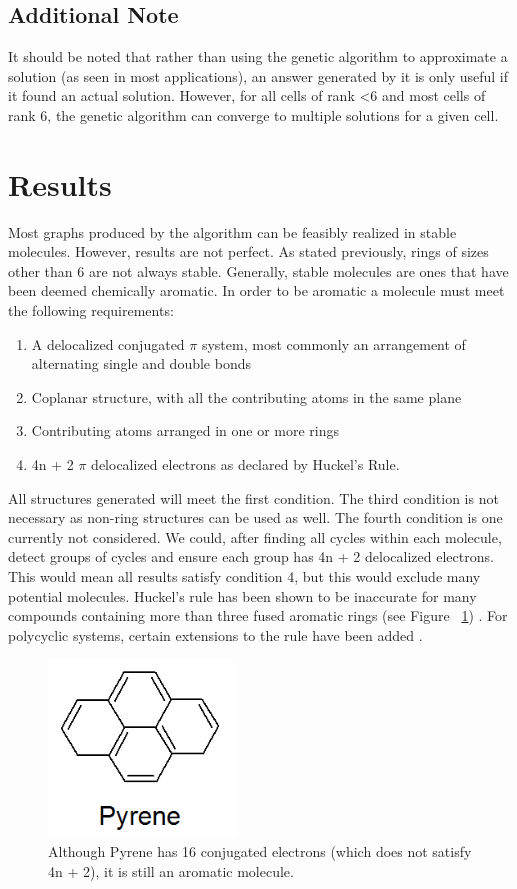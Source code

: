 \documentclass[12pt]{article}
\begin{document}
\subsection{Additional Note}

It should be noted that rather than using the genetic algorithm to approximate a solution (as seen in most applications), an answer generated by it is only useful if it found an actual solution. However, for all cells of rank \textless 6 and most cells of rank 6, the genetic algorithm can converge to multiple solutions for a given cell. 

\section{Results}

Most graphs produced by the algorithm can be feasibly realized in stable molecules. However, results are not perfect. As stated previously, rings of sizes other than 6 are not always stable. Generally, stable molecules are ones that have been deemed chemically aromatic. In order to be aromatic a molecule must meet the following requirements: 

\begin{enumerate}
\item A delocalized conjugated $\pi$ system, most commonly an arrangement of alternating single and double bonds
\item Coplanar structure, with all the contributing atoms in the same plane
\item Contributing atoms arranged in one or more rings
\item 4n + 2 $\pi$ delocalized electrons as declared by Huckel's Rule.
\end{enumerate}

All structures generated will meet the first condition. The third condition is not necessary as non-ring structures can be used as well. The fourth condition is one currently not considered. We could, after finding all cycles within each molecule, detect groups of cycles and ensure each group has 4n + 2 delocalized electrons. This would mean all results satisfy condition 4, but this would exclude many potential molecules. Huckel's rule has been shown to be inaccurate for many compounds containing more than three fused aromatic rings (see Figure ~\ref{fig:pyrene}) \cite{HuckelBad}. For polycyclic systems, certain extensions to the rule have been added \cite{HuckelExtension}.

\begin{figure}[ht!]
\centering
\includegraphics[width=50mm]{pyrene.png}
\caption{Although Pyrene has 16 conjugated electrons (which does not satisfy 4n + 2), it is still an aromatic molecule.}
\label{fig:pyrene}
\end{figure}
\end{document}
